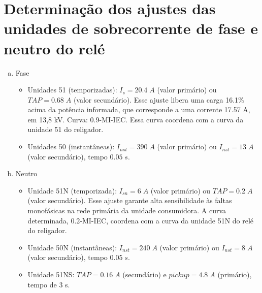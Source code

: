 \section{Determinação dos ajustes das unidades de sobrecorrente de fase e neutro do relé}

\begin{enumerate}[(a)]
    \item Fase
    \begin{itemize}
        \item Unidades 51 (temporizadas): $I_s = 20.4 \; A$ (valor primário) ou $TAP = 0.68 \; A$ (valor secundário). Esse ajuste libera uma carga 16.1\% acima da potência informada, que corresponde a uma corrente 17.57 A, em 13,8 kV. Curva: 0.9-MI-IEC. Essa curva coordena com a curva da unidade 51 do religador.
        \item Unidades 50 (instantâneas): $I_{nst} = 390\; A$ (valor primário) ou $I_{nst} = 13\; A$ (valor secundário), tempo $0.05 \;s$.
    \end{itemize}
    \item Neutro
    \begin{itemize}
        \item Unidade 51N (temporizada): $I_{sn} = 6\; A$ (valor primário) ou $TAP = 0.2\; A$ (valor secundário). Esse ajuste garante alta sensibilidade às faltas monofásicas na rede primária da unidade consumidora. A curva determinada, 0.2-MI-IEC, coordena com a curva da unidade 51N do relé do religador.
        \item Unidade 50N (instantâneas): $I_{nst} = 240\; A$ (valor primário) ou $I_{nst} = 8\; A$ (valor secundário), tempo $0.05 \;s$.
        \item Unidade 51NS: $TAP = 0.16 \; A$ (secundário) e $pickup = 4.8 \; A$ (primário), tempo de 3 s.
    \end{itemize}
\end{enumerate}

